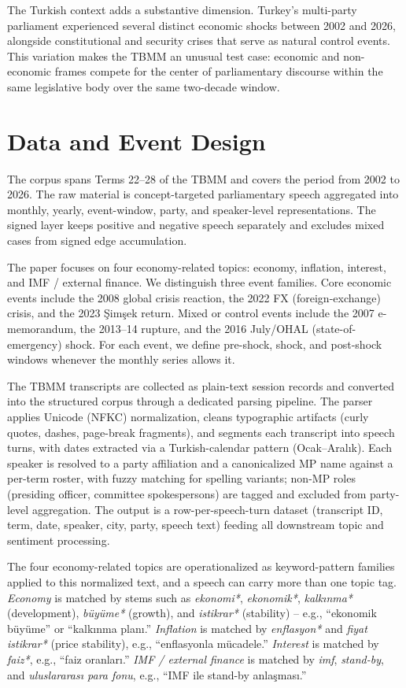 \documentclass[conference]{IEEEtran}
\begin{document}
The Turkish context adds a substantive dimension. Turkey's multi-party parliament experienced several distinct economic shocks between 2002 and 2026, alongside constitutional and security crises that serve as natural control events. This variation makes the TBMM an unusual test case: economic and non-economic frames compete for the center of parliamentary discourse within the same legislative body over the same two-decade window.

\smallskip
\section{Data and Event Design}
The corpus spans Terms 22--28 of the TBMM and covers the period from 2002 to 2026. The raw material is concept-targeted parliamentary speech aggregated into monthly, yearly, event-window, party, and speaker-level representations. The signed layer keeps positive and negative speech separately and excludes mixed cases from signed edge accumulation.

The paper focuses on four economy-related topics: economy, inflation, interest, and IMF / external finance. We distinguish three event families. Core economic events include the 2008 global crisis reaction, the 2022 FX (foreign-exchange) crisis, and the 2023 Şimşek return. Mixed or control events include the 2007 e-memorandum, the 2013--14 rupture, and the 2016 July/OHAL (state-of-emergency) shock. For each event, we define pre-shock, shock, and post-shock windows whenever the monthly series allows it.

The TBMM transcripts are collected as plain-text session records and converted into the structured corpus through a dedicated parsing pipeline. The parser applies Unicode (NFKC) normalization, cleans typographic artifacts (curly quotes, dashes, page-break fragments), and segments each transcript into speech turns, with dates extracted via a Turkish-calendar pattern (Ocak--Aralık). Each speaker is resolved to a party affiliation and a canonicalized MP name against a per-term roster, with fuzzy matching for spelling variants; non-MP roles (presiding officer, committee spokespersons) are tagged and excluded from party-level aggregation. The output is a row-per-speech-turn dataset (transcript ID, term, date, speaker, city, party, speech text) feeding all downstream topic and sentiment processing.

The four economy-related topics are operationalized as keyword-pattern families applied to this normalized text, and a speech can carry more than one topic tag. \emph{Economy} is matched by stems such as \emph{ekonomi*}, \emph{ekonomik*}, \emph{kalkınma*} (development), \emph{büyüme*} (growth), and \emph{istikrar*} (stability) -- e.g., ``ekonomik büyüme'' or ``kalkınma planı.'' \emph{Inflation} is matched by \emph{enflasyon*} and \emph{fiyat istikrar*} (price stability), e.g., ``enflasyonla mücadele.'' \emph{Interest} is matched by \emph{faiz*}, e.g., ``faiz oranları.'' \emph{IMF / external finance} is matched by \emph{imf}, \emph{stand-by}, and \emph{uluslararası para fonu}, e.g., ``IMF ile stand-by anlaşması.''
\end{document}
